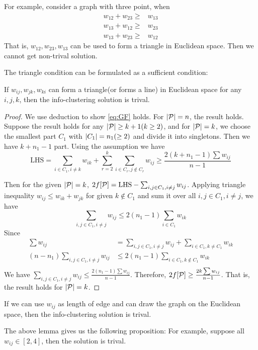 \documentclass{article}
\begin{document}
For example, consider a graph with three point, when 
\begin{align*}
w_{12}+w_{23}\geq & w_{13} \\
w_{13}+w_{12}\geq & w_{23} \\
w_{13}+w_{23}\geq & w_{12} 
\end{align*}
That is, $w_{12}, w_{23}, w_{13}$ can be used to form a triangle in Euclidean space. Then we cannot get non-trival solution.

The triangle condition can be formulated as a sufficient condition:
\begin{lemma}
If $w_{ij}, w_{jk}, w_{ki}$ can form a triangle(or forms a line) in Euclidean space for any $i, j, k$, then the info-clustering solution is trival.
\end{lemma}
\begin{proof}
We use deduction to show  \eqref{eq:GF} holds. For $\abs{\P}=n$, the result holds. Suppose the result holds for any $\abs{\P} \geq k+1(k\geq 2)$, and for $\abs{\P}=k$, we choose the smallest part $C_1$ with $\abs{C_1}=n_1(\geq 2)$ and divide it into singletons. Then we have $k+n_1-1$ part. Using the assumption we have
$$
\mathrm{LHS} = \sum_{i\in C_1, i\neq k} w_{ik} + \sum_{r=2}^k \sum_{i \in C_r, j \not\in C_r} w_{ij}\geq \frac{2(k+n_1 -1)\sum w_{ij}}{n-1}
$$

Then for the given $\abs{\P}=k$, $2f[\P] =\mathrm{LHS} - \sum_{i,j\in C_1, i\neq j} w_{ij}$.
Applying triangle inequality $w_{ij} \leq w_{ik} + w_{jk}$ for given $k\not\in C_1$ and sum it over all $i, j \in C_1, i\neq j$, we have
$$
\sum_{i,j \in C_1, i\neq j} w_{ij} \leq 2(n_1-1)\sum_{i\in C_1} w_{ik}
$$
Since
\begin{align*}
\sum w_{ij} &= \sum_{i,j \in C_1, i\neq j} w_{ij} + \sum_{i\in C_1, k\neq C_1} w_{ik} \\
(n - n_1) \sum_{i,j \in C_1, i\neq j} w_{ij}& \leq 2(n_1 - 1) \sum_{i \in C_1, k \not\in C_1} w_{ik} \\
\end{align*}
We have $\sum_{i,j \in C_1, i\neq j} w_{ij} \leq \frac{2(n_1-1) \sum w_{ij}}{n-1}$. Therefore, 
$2f[\P] \geq \frac{2k \sum w_{ij}}{n-1}$. That is, the result holds for $\abs{\P}=k$.
\end{proof}
If we can use $w_{ij}$ as length of edge and can draw the graph on the Euclidean space, then the info-clustering solution is trival.

The above lemma gives us the following proposition:
For example, suppose all $w_{ij} \in [2,4]$, then the solution is trival.
\end{document}
